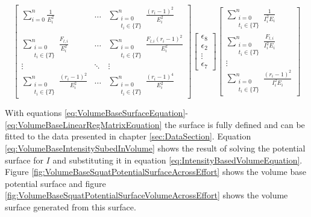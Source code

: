 \begin{equation}
    \label{eq:VolumeBaseLinearRegMatrixEquation}
	\left[
    \begin{matrix}
        \sum_{i=0}^n \frac{1}{E_i^2} &
        \dots &
        \sum_{\substack{i=0\\ t_i\in \{ T \}}}^n \frac{(r_i-1)^2}{E_i^2} \\

        \sum_{\substack{i=0\\ t_i\in \{ T \}}}^n  \frac{F_{l,i}}{E_i^2} &
        \dots &
        \sum_{\substack{i=0\\ t_i\in \{ T \}}}^n \frac{F_{l,i}(r_i-1)^2}{E_i^2}\\

        \vdots &
        \ddots &
        \vdots \\
        
        \sum_{\substack{i=0\\ t_i\in \{ T \}}}^n \frac{(r_i-1)^2}{E_i^2} &
        \dots &
        \sum_{\substack{i=0\\ t_i\in \{ T \}}}^n \frac{(r_i-1)^4}{E_i^2}
    \end{matrix}
    \right]
    \left[
    \begin{matrix}
        \epsilon_8 \\ \epsilon_2 \\ \vdots \\ \epsilon_7
    \end{matrix}
    \right]
	\left[
    \begin{matrix}
        \sum_{\substack{i=0\\ t_i\in \{ T \}}}^n \frac{1}{I_i^2E_i} \\
        \sum_{\substack{i=0\\ t_i\in \{ T \}}}^n \frac{F_{l,i}}{I_i^2E_i} \\
        \vdots \\
        \sum_{\substack{i=0\\ t_i\in \{ T \}}}^n \frac{(r_i-1)^2}{I_i^2E_i}  
    \end{matrix}
    \right]
\end{equation}

With equations \ref{eq:VolumeBaseSurfaceEquation}- \ref{eq:VolumeBaseLinearRegMatrixEquation} the surface is fully defined and can be fitted to the data presented in chapter \ref{sec:DataSection}. Equation \ref{eq:VolumeBaseIntensitySubedInVolume} shows the result of solving the potential surface for $I$ and substituting it in equation \ref{eq:IntensityBasedVolumeEquation}. Figure \ref{fig:VolumeBaseSquatPotentialSurfaceAcrossEffort} shows the volume base potential surface and figure \ref{fig:VolumeBaseSquatPotentialSurfaceVolumeAcrossEffort} shows the volume surface generated from this surface.

